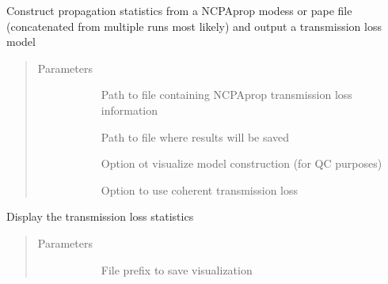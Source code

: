 \documentclass[letterpaper,10pt,english]{sphinxmanual}
\begin{document}
\begin{fulllineitems}
\begin{fulllineitems}
\label{\detokenize{stochprop.propagation:stochprop.propagation.TLossModel.build}}
Construct propagation statistics from a NCPAprop modess or pape file (concatenated from
multiple runs most likely) and output a transmission loss model
\begin{quote}\begin{description}
\item[{Parameters}] \leavevmode\begin{description}
\item[{}] \leavevmode
Path to file containing NCPAprop transmission loss information

\item[{}] \leavevmode
Path to file where results will be saved

\item[{}] \leavevmode
Option ot visualize model construction (for QC purposes)

\item[{}] \leavevmode
Option to use coherent transmission loss

\end{description}

\end{description}\end{quote}

\end{fulllineitems}


\begin{fulllineitems}
\label{\detokenize{stochprop.propagation:stochprop.propagation.TLossModel.display}}
Display the transmission loss statistics
\begin{quote}\begin{description}
\item[{Parameters}] \leavevmode\begin{description}
\item[{}] \leavevmode
File prefix to save visualization


\end{description}
\end{description}
\end{quote}
\end{fulllineitems}
\end{fulllineitems}
\end{document}
